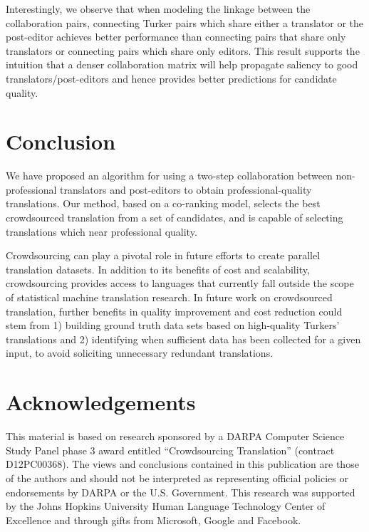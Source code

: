 \documentclass[11pt]{article}
\begin{document}
Interestingly, we observe that when modeling the linkage between the collaboration pairs, connecting Turker pairs which share either a translator or the post-editor achieves better performance than connecting pairs that share only translators or connecting pairs which share only editors. This result supports the intuition that a denser collaboration matrix will help propagate saliency to good translators/post-editors and hence provides better predictions for candidate quality.



\section{Conclusion}
We have proposed an algorithm for using a two-step collaboration between non-professional translators and post-editors to obtain professional-quality translations. Our method, based on a co-ranking model,  selects the best crowdsourced translation from a set of candidates, and is capable of selecting translations which near professional quality.

Crowdsourcing can play a pivotal role in future efforts to create parallel translation datasets. In addition to its benefits of cost and scalability, crowdsourcing provides access to languages that currently fall outside the scope of statistical machine translation research. In future work on crowdsourced translation, further benefits in quality improvement and cost reduction could stem from 1) building ground truth data sets based on high-quality Turkers' translations and 2) identifying when sufficient data has been collected for a given input, to avoid soliciting unnecessary redundant translations.

\section*{Acknowledgements}
This material is based on research sponsored by a DARPA Computer Science Study Panel phase 3 award entitled ``Crowdsourcing Translation'' (contract D12PC00368). The views and conclusions contained in this publication are those of the authors and should not be interpreted as representing official policies or endorsements by DARPA or the U.S. Government. This research was supported by the Johns Hopkins University Human Language Technology Center of Excellence and through gifts from Microsoft, Google and Facebook.







\end{document}
